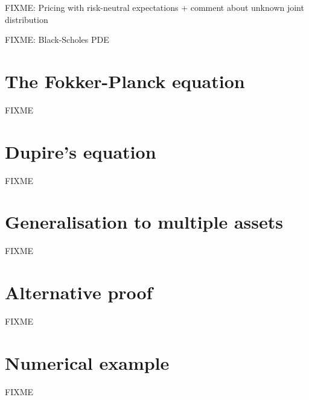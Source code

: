 \documentclass[a4paper]{article}
\begin{document}
FIXME: Pricing with risk-neutral expectations + comment about unknown joint distribution

FIXME: Black-Scholes PDE

\section{The Fokker-Planck equation}


FIXME

\section{Dupire's equation}


FIXME

\section{Generalisation to multiple assets}


FIXME

\section{Alternative proof}


FIXME

\section{Numerical example}


FIXME

\pagebreak
\printbibliography
\end{document}

